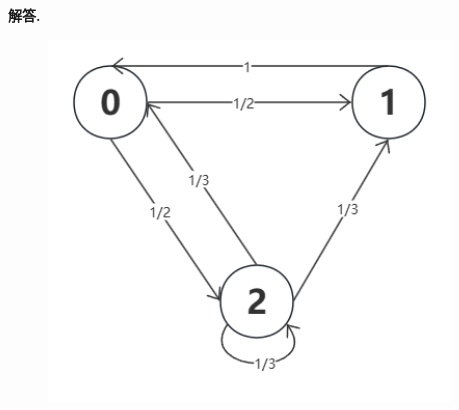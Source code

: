 \documentclass[12pt, a4paper, oneside]{ctexart}
\newenvironment{solution}{\par\noindent\textbf{解答. }}{\par}
\begin{document}
\begin{solution}
\begin{figure}[!h]
\begin{minipage}[c]{0.3\textwidth}
            \includegraphics[width=0.95\textwidth]{img/c.png}
        \end{minipage}
    \end{figure}
\end{solution}
\end{document}
